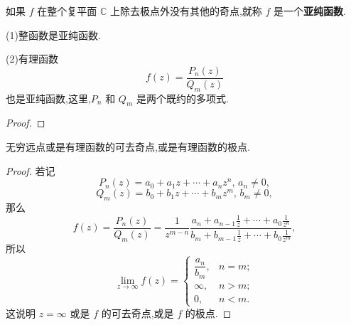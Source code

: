 \documentclass[../../main.tex]{subfiles}
\begin{document}
\begin{definition}
如果 \( f \) 在整个复平面 \( \mathbb{C} \) 上除去极点外没有其他的奇点,就称 \( f \) 是一个\textbf{亚纯函数}.
\end{definition}

\begin{proposition}
(1)整函数是亚纯函数.

(2)有理函数
\[
f(z) = \frac{P_n(z)}{Q_m(z)}
\]
也是亚纯函数,这里,\( P_n \) 和 \( Q_m \) 是两个既约的多项式.
\end{proposition}
\begin{proof}

\end{proof}

\begin{proposition}
无穷远点或是有理函数的可去奇点,或是有理函数的极点.
\end{proposition}
\begin{proof}
若记
\[
P_n(z) = a_0 + a_1 z + \cdots + a_n z^n, \, a_n \neq 0,
\]
\[
Q_m(z) = b_0 + b_1 z + \cdots + b_m z^m, \, b_m \neq 0,
\]
那么
\[
f(z) = \frac{P_n(z)}{Q_m(z)} = \frac{1}{z^{m - n}} \frac{a_n + a_{n - 1} \frac{1}{z} + \cdots + a_0 \frac{1}{z^n}}{b_m + b_{m - 1} \frac{1}{z} + \cdots + b_0 \frac{1}{z^m}},
\]
所以
\[
\lim_{z \to \infty} f(z) = \begin{cases} 
\dfrac{a_n}{b_m}, & n = m; \\
\infty, & n > m; \\
0, & n < m.
\end{cases}
\]
这说明 \( z = \infty \) 或是 \( f \) 的可去奇点,或是 \( f \) 的极点.
\end{proof}
\end{document}
